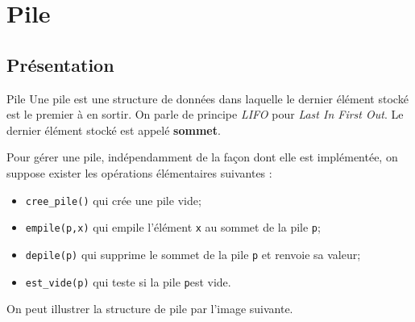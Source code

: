 


\section{Pile}
\subsection{Présentation}
\begin{defi}{Pile}
Une pile est une structure de données dans laquelle le dernier élément stocké est le premier à en sortir. On parle de principe \textit{LIFO} pour \textit{Last In First Out}. Le dernier élément stocké est appelé \textbf{sommet}.
\end{defi}

Pour gérer une pile, indépendamment de la façon dont elle est implémentée, on suppose exister les opérations élémentaires suivantes : 
\begin{itemize}
\item \texttt{cree\_pile()} qui crée une pile vide;
\item \texttt{empile(p,x)} qui empile l'élément \texttt{x} au sommet de la pile \texttt{p};
\item \texttt{depile(p)} qui supprime le sommet de la pile \texttt{p} et renvoie sa valeur;
\item \texttt{est\_vide(p)} qui teste si la pile \texttt{p}est vide.
\end{itemize}

On peut illustrer la structure de pile par l'image suivante.

